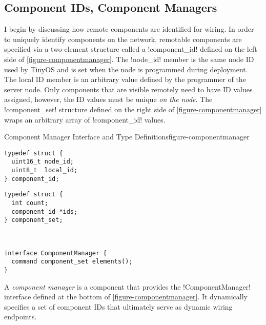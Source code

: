 \subsection{Component IDs, Component Managers}
\label{section-componentmanager}

I begin by discussing how remote components are identified for wiring. In order to uniquely
identify components on the network, remotable components are specified via a two-element
structure called a !component_id! defined on the left side of \autoref{figure-componentmanager}.
The !node_id! member is the same node ID used by TinyOS and is set when the node is programmed
during deployment. The local ID member is an arbitrary value defined by the programmer of the
server node. Only components that are visible remotely need to have ID values assigned, however,
the ID values must be unique \emph{on the node}. The !component_set! structure defined on the
right side of \autoref{figure-componentmanager} wraps an arbitrary array of !component_id!
values.
 
\begin{fpfig}[t]{Component Manager Interface and Type Definitions}{figure-componentmanager}
{
\begin{minipage}[t]{2.5in}
\singlespace
\begin{lstlisting}
typedef struct {
  uint16_t node_id;
  uint8_t  local_id;
} component_id;
\end{lstlisting}
\primaryspacing
\end{minipage}
\hfill
\begin{minipage}[t]{2.5in}
\singlespace
\begin{lstlisting}
typedef struct {
  int count;
  component_id *ids;
} component_set;
\end{lstlisting}
\primaryspacing
\end{minipage}
\\
\centering
\begin{minipage}[t]{5in}
\vspace{1.5em}
\singlespace
\begin{lstlisting}
interface ComponentManager {
  command component_set elements();
}
\end{lstlisting}
\primaryspacing
\end{minipage}
}
\end{fpfig}

A \emph{component manager} is a component that provides the !ComponentManager! interface defined
at the bottom of \autoref{figure-componentmanager}. It dynamically specifies a set of component
IDs that ultimately serve as dynamic wiring endpoints.

